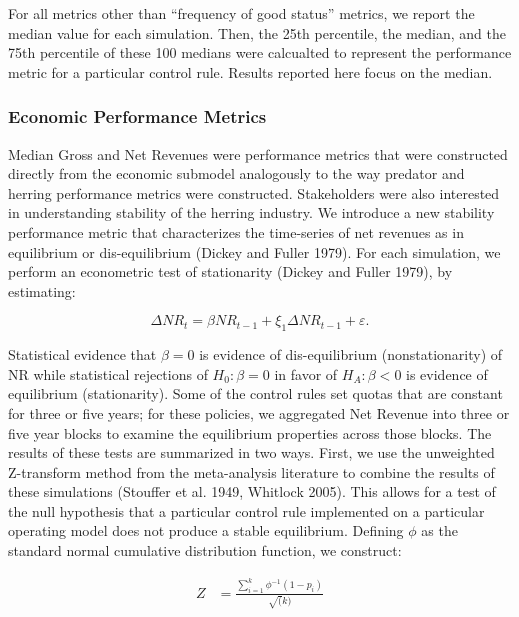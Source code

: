 \documentclass[]{article}
\begin{document}
For all metrics other than ``frequency of good status'' metrics, we
report the median value for each simulation. Then, the 25th percentile,
the median, and the 75th percentile of these 100 medians were calcualted
to represent the performance metric for a particular control rule.
Results reported here focus on the median.

\subsubsection{Economic Performance
Metrics}\label{economic-performance-metrics}

Median Gross and Net Revenues were performance metrics that were
constructed directly from the economic submodel analogously to the way
predator and herring performance metrics were constructed. Stakeholders
were also interested in understanding stability of the herring industry.
We introduce a new stability performance metric that characterizes the
time-series of net revenues as in equilibrium or dis-equilibrium (Dickey
and Fuller 1979). For each simulation, we perform an econometric test of
stationarity (Dickey and Fuller 1979), by estimating:

\begin{equation}
\label{DF_estimated}
\Delta NR_{t} = \beta  NR_{t-1} + \xi_1 \Delta NR_{t-1} + \varepsilon. 
\end{equation}

Statistical evidence that \(\beta=0\) is evidence of dis-equilibrium
(nonstationarity) of NR while statistical rejections of \(H_0: \beta=0\)
in favor of \(H_A: \beta<0\) is evidence of equilibrium (stationarity).
Some of the control rules set quotas that are constant for three or five
years; for these policies, we aggregated Net Revenue into three or five
year blocks to examine the equilibrium properties across those blocks.
The results of these tests are summarized in two ways. First, we use the
unweighted Z-transform method from the meta-analysis literature to
combine the results of these simulations (Stouffer et al. 1949, Whitlock
2005). This allows for a test of the null hypothesis that a particular
control rule implemented on a particular operating model does not
produce a stable equilibrium. Defining \(\phi\) as the standard normal
cumulative distribution function, we construct:

\begin{align}
Z  &= \frac{\sum_{i=1}^k \phi^{-1} (1-p_i)}{\sqrt(k)}
\end{align}
\end{document}
